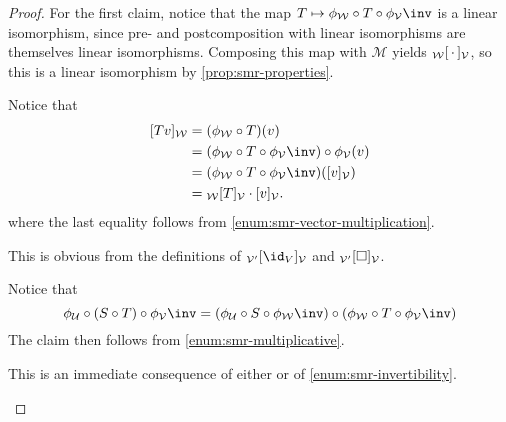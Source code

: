 \documentclass[article, a4paper, 11pt, oneside]{memoir}
\numberwithin{equation}{chapter}
\newcommand{\calM}{\mathcal{M}}
\newcommand{\calV}{\mathcal{V}}
\newcommand{\calW}{\mathcal{W}}
\newcommand{\calU}{\mathcal{U}}
\begin{document}
\begin{proof}
    For the first claim, notice that the map $T \mapsto \coordmap{\calW} \circ T \circ \coordmap{\calV}\inv$ is a linear isomorphism, since pre- and postcomposition with linear isomorphisms are themselves linear isomorphisms. Composing this map with $\calM$ yields $\mr{\calW}{\,\cdot\,}{\calV}$, so this is a linear isomorphism by \cref{prop:smr-properties}.
    \begin{proofsec}
        \item[Proof of \subcref{enum:mr-vector-multiplication}]
        Notice that
        \begin{align*}
            \coordvec{Tv}{\calW}
                &= (\coordmap{\calW} \circ T)(v) \\
                &= (\coordmap{\calW} \circ T \circ \coordmap{\calV}\inv) \circ \coordmap{\calV}(v) \\
                &= (\coordmap{\calW} \circ T \circ \coordmap{\calV}\inv)(\coordvec{v}{\calV}) \\
                &= \mr{\calW}{T}{\calV} \cdot \coordvec{v}{\calV}.
        \end{align*}
        where the last equality follows from \cref{enum:smr-vector-multiplication}.

        \item[Proof of \subcref{enum:mr-of-identity-map}]
        This is obvious from the definitions of $\mr{\calV'}{\id_V}{\calV}$ and $\basischangemat{\calV'}{\calV}$.

        \item[Proof of \subcref{enum:mr-multiplicative}]
        Notice that
        \begin{equation*}
            \coordmap{\calU} \circ (S \circ T) \circ \coordmap{\calV}\inv
                = (\coordmap{\calU} \circ S \circ \coordmap{\calW}\inv) \circ (\coordmap{\calW} \circ T \circ \coordmap{\calV}\inv)
        \end{equation*}
        The claim then follows from \cref{enum:smr-multiplicative}.

        \item[Proof of \subcref{enum:mr-invertibility}]
        This is an immediate consequence of either  or of \cref{enum:smr-invertibility}.
    \end{proofsec}
\end{proof}
\end{document}
